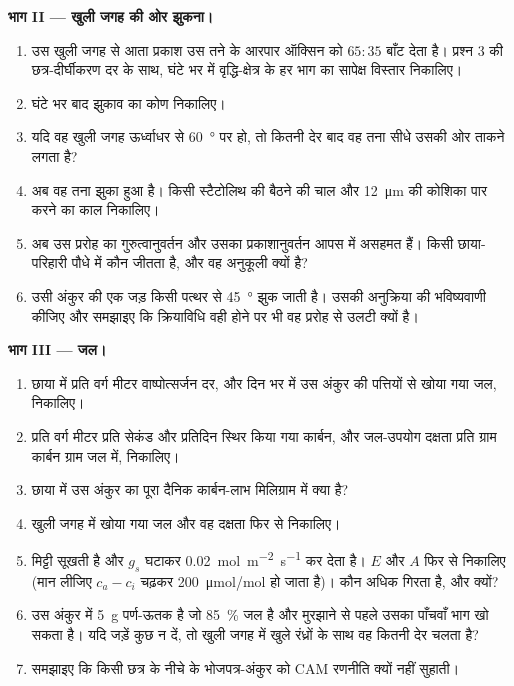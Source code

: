 \begin{problem}
\medskip
\noindent\textbf{भाग II --- खुली जगह की ओर झुकना।}
\begin{enumerate}[resume]
  \item उस खुली जगह से आता प्रकाश उस तने के आरपार ऑक्सिन को $65 : 35$
        बाँट देता है। प्रश्न 3 की छत्र-दीर्घीकरण दर के साथ, घंटे भर में
        वृद्धि-क्षेत्र के हर भाग का सापेक्ष विस्तार निकालिए।
  \item घंटे भर बाद झुकाव का कोण निकालिए।
  \item यदि वह खुली जगह ऊर्ध्वाधर से \qty{60}{\degree} पर हो, तो कितनी
        देर बाद वह तना सीधे उसकी ओर ताकने लगता है?
  \item अब वह तना झुका हुआ है। किसी स्टैटोलिथ की बैठने की चाल और
        \qty{12}{\micro m} की कोशिका पार करने का काल निकालिए।
  \item अब उस प्ररोह का गुरुत्वानुवर्तन और उसका प्रकाशानुवर्तन आपस में
        असहमत हैं। किसी छाया-परिहारी पौधे में कौन जीतता है, और वह
        अनुकूली क्यों है?
  \item उसी अंकुर की एक जड़ किसी पत्थर से \qty{45}{\degree} झुक जाती
        है। उसकी अनुक्रिया की भविष्यवाणी कीजिए और समझाइए कि क्रियाविधि
        वही होने पर भी वह प्ररोह से उलटी क्यों है।
\end{enumerate}

\medskip
\noindent\textbf{भाग III --- जल।}
\begin{enumerate}[resume]
  \item छाया में प्रति वर्ग मीटर वाष्पोत्सर्जन दर, और दिन भर में उस
        अंकुर की पत्तियों से खोया गया जल, निकालिए।
  \item प्रति वर्ग मीटर प्रति सेकंड और प्रतिदिन स्थिर किया गया कार्बन,
        और जल-उपयोग दक्षता प्रति ग्राम कार्बन ग्राम जल में, निकालिए।
  \item छाया में उस अंकुर का पूरा दैनिक कार्बन-लाभ मिलिग्राम में क्या
        है?
  \item खुली जगह में खोया गया जल और वह दक्षता फिर से निकालिए।
  \item मिट्टी सूखती है और  $g_s$ घटाकर
        \qty{0.02}{mol.m^{-2}.s^{-1}} कर देता है। $E$ और $A$ फिर से
        निकालिए (मान लीजिए $c_a - c_i$ चढ़कर \qty{200}{\micro mol/mol}
        हो जाता है)। कौन अधिक गिरता है, और क्यों?
  \item उस अंकुर में \qty{5}{g} पर्ण-ऊतक है जो \qty{85}{\%}
        जल है और मुरझाने से पहले उसका पाँचवाँ भाग खो सकता है। यदि जड़ें
        कुछ न दें, तो खुली जगह में खुले रंध्रों के साथ वह कितनी देर
        चलता है?
  \item समझाइए कि किसी छत्र के नीचे के भोजपत्र-अंकुर को CAM रणनीति
        क्यों नहीं सुहाती।
\end{enumerate}


\end{problem}
